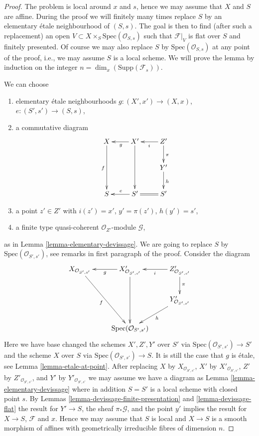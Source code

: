 \begin{proof}
The problem is local around $x$ and $s$, hence we may assume that $X$
and $S$ are affine. During the proof we will finitely many times replace
$S$ by an elementary \'etale neighbourhood of $(S, s)$. The goal is then to find
(after such a replacement) an open
$V \subset X \times_S \text{Spec}(\mathcal{O}_{S, s})$
such that $\mathcal{F}|_V$ is flat over $S$ and finitely presented.
Of course we may also replace $S$ by $\text{Spec}(\mathcal{O}_{S, s})$
at any point of the proof, i.e., we may assume $S$ is a local scheme.
We will prove the lemma by induction on the integer
$n = \dim_x(\text{Supp}(\mathcal{F}_s))$.

\medskip\noindent
We can choose
\begin{enumerate}
\item elementary \'etale neighbourhoods $g : (X', x') \to (X, x)$,
$e : (S', s') \to (S, s)$,
\item a commutative diagram
$$
\xymatrix{
X \ar[dd]_f & X' \ar[dd] \ar[l]^g & Z' \ar[l]^i \ar[d]^\pi \\
& & Y' \ar[d]^h \\
S & S' \ar[l]_e & S' \ar@{=}[l]
}
$$
\item a point $z' \in Z'$ with $i(z') = x'$, $y' = \pi(z')$, $h(y') = s'$,
\item a finite type quasi-coherent $\mathcal{O}_{Z'}$-module $\mathcal{G}$,
\end{enumerate}
as in
Lemma \ref{lemma-elementary-devissage}.
We are going to replace $S$ by $\text{Spec}(\mathcal{O}_{S', s'})$, see
remarks in first paragraph of the proof. Consider the diagram
$$
\xymatrix{
X_{\mathcal{O}_{S', s'}} \ar[ddr]_f &
X'_{\mathcal{O}_{S', s'}} \ar[dd] \ar[l]^g &
Z'_{\mathcal{O}_{S', s'}} \ar[l]^i \ar[d]^\pi \\
& & Y'_{\mathcal{O}_{S', s'}} \ar[dl]^h \\
& \text{Spec}(\mathcal{O}_{S', s'})
}
$$
Here we have base changed the schemes $X', Z', Y'$ over $S'$ via
$\text{Spec}(\mathcal{O}_{S', s'}) \to S'$ and the scheme $X$ over $S$ via
$\text{Spec}(\mathcal{O}_{S', s'}) \to S$. It is still the case that
$g$ is \'etale, see
Lemma \ref{lemma-etale-at-point}.
After replacing $X$ by $X_{\mathcal{O}_{S', s'}}$,
$X'$ by $X'_{\mathcal{O}_{S', s'}}$,
$Z'$ by $Z'_{\mathcal{O}_{S', s'}}$, and
$Y'$ by $Y'_{\mathcal{O}_{S', s'}}$
we may assume we have a diagram as
Lemma \ref{lemma-elementary-devissage}
where in addition $S = S'$ is a local scheme with closed point $s$. By
Lemmas \ref{lemma-devissage-finite-presentation} and
\ref{lemma-devissage-flat}
the result for $Y' \to S$, the sheaf $\pi_*\mathcal{G}$, and the
point $y'$ implies the result for $X \to S$, $\mathcal{F}$ and $x$.
Hence we may assume that $S$ is local and $X \to S$ is a smooth morphism
of affines with geometrically irreducible fibres of dimension $n$.


\end{proof}
